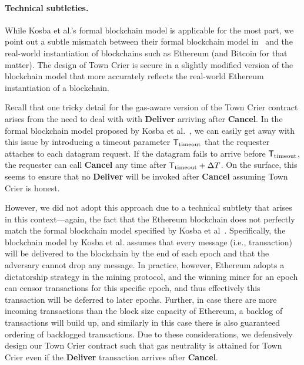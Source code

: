 \newcommand{\Ttimeout}{\ensuremath{{\sf T}_{\text{timeout}}}\xspace}

\paragraph{Technical subtleties.}
While Kosba et al.'s formal blockchain model is applicable for the most part,
we point out a subtle mismatch
between their formal blockchain model in~\cite{hawk} and
the real-world instantiation of blockchains such as 
Ethereum (and Bitcoin for that matter).
The design of Town Crier is secure in a slightly modified
version of the blockchain model that more accurately reflects
the real-world Ethereum instantiation of a blockchain.


Recall that one tricky detail for the gas-aware version of the Town Crier 
contract arises from the need to deal with  
with {\bf Deliver}
arriving after {\bf Cancel}.
In the formal blockchain model
proposed by Kosba et al.~\cite{hawk}, we can easily get away with this issue 
by introducing 
a timeout parameter
$\Ttimeout$ that the requester attaches to each datagram request. 
If the datagram fails to arrive before $\Ttimeout$, 
the requester can call {\bf Cancel}
any time after 
$\Ttimeout + \Delta T$.  
On the surface, this 
seems to ensure that no {\bf Deliver} will be invoked
after {\bf Cancel} assuming Town Crier is honest. 

However, we did not adopt this approach due to a technical subtlety
that arises in this context---again, the fact that  
the Ethereum blockchain does not  
perfectly match the formal blockchain 
model specified by Kosba et al~\cite{hawk}.
Specifically, the blockchain model by Kosba et al.
assumes that every message (i.e., transaction) will be delivered 
to the blockchain 
by the end of each epoch and that the adversary cannot drop
any message.
In practice, however, 
Ethereum adopts a dictatorship 
strategy in the mining protocol, and the winning miner 
for an epoch can censor transactions for this specific epoch, and thus
effectively this transaction will be deferred to later epochs.
Further, in case there are more incoming transactions than the block size
capacity of Ethereum, a backlog of transactions will build up, 
and similarly in this case there is also guaranteed
ordering of backlogged transactions.
Due to these considerations, we defensively design our Town Crier contract
such that gas neutrality is attained for Town Crier
even if the {\bf Deliver} transaction arrives after {\bf Cancel}.







